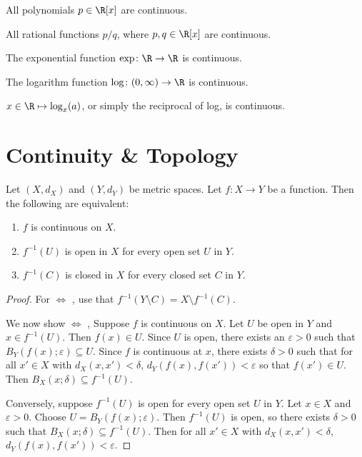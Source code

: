 \begin{examples}
    \item All polynomials $p \in \R[x]$ are continuous.
    \item All rational functions $p/q$,
    where $p, q \in \R[x]$ are continuous.
    \item The exponential function $\exp\colon \R \to \R$ is continuous.
    \item The logarithm function $\log\colon (0, \infty) \to \R$
    is continuous.
    \item $x \in \R \mapsto \log_x(a)$, or simply the reciprocal of
    log, is continuous.
\end{examples}
\section{Continuity \& Topology} \label{sec:cont:open-close}
\begin{theorem} \label{thm:cont:open-close}
    Let $(X, d_X)$ and $(Y, d_Y)$ be metric spaces.
    Let $f\colon X \to Y$ be a function.
    Then the following are equivalent:
    \begin{enumerate}
        \item $f$ is continuous on $X$.
        \label{thm:cont:open-close:cont}
        \item $f^{-1}(U)$ is open in $X$ for every open set $U$ in $Y$.
        \label{thm:cont:open-close:open}
        \item $f^{-1}(C)$ is closed in $X$ for every closed set $C$ in $Y$.
        \label{thm:cont:open-close:closed}
    \end{enumerate}
\end{theorem}
\begin{proof}
    For 
    $\iff$ ,
    use that $f^{-1}(Y \setminus C) = X \setminus f^{-1}(C)$.

    We now show 
    $\iff$ ,
    Suppose $f$ is continuous on $X$.
    Let $U$ be open in $Y$ and $x \in f^{-1}(U)$.
    Then $f(x) \in U$.
    Since $U$ is open, there exists an $\varepsilon > 0$ such that
    $B_Y(f(x); \varepsilon) \subseteq U$.
    Since $f$ is continuous at $x$, there exists $\delta > 0$ such that
    for all $x' \in X$ with $d_X(x, x') < \delta$,
    $d_Y(f(x), f(x')) < \varepsilon$ so that $f(x') \in U$.
    Then $B_X(x; \delta) \subseteq f^{-1}(U)$.

    Conversely, suppose $f^{-1}(U)$ is open for every open set $U$ in $Y$.
    Let $x \in X$ and $\varepsilon > 0$.
    Choose $U = B_Y(f(x); \varepsilon)$.
    Then $f^{-1}(U)$ is open, so there exists $\delta > 0$ such that
    $B_X(x; \delta) \subseteq f^{-1}(U)$.
    Then for all $x' \in X$ with $d_X(x, x') < \delta$,
    $d_Y(f(x), f(x')) < \varepsilon$.
\end{proof}
